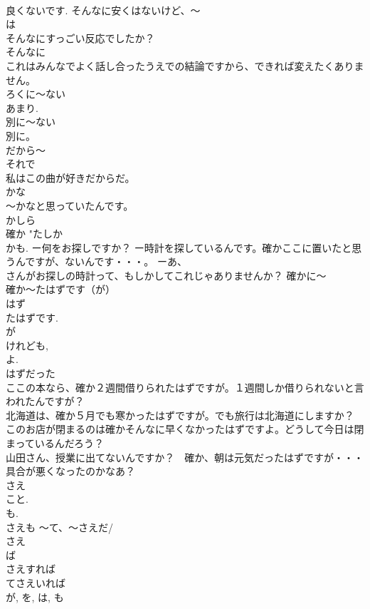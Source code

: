 \documentclass[8pt]{extreport}
\begin{document}
\begin{CJK}{UTF8}{min}
\\	良くないです. そんなに安くはないけど、～ 
\\	は 
\\	そんなにすっごい反応でしたか？ 
\\	そんなに 
\\	これはみんなでよく話し合ったうえでの結論ですから、できれば変えたくありません。 
\\	ろくに～ない	
\\	あまり. 
\\	別に～ない 
\\	別に。 
\\	だから～	
\\	それで 
\\	私はこの曲が好きだからだ。
\\	かな	
\\	～かなと思っていたんです。　
\\	かしら 
\\	確か	"たしか 
\\	かも. ー何をお探しですか？ ー時計を探しているんです。確かここに置いたと思うんですが、ないんです・・・。 ーあ、
\\	さんがお探しの時計って、もしかしてこれじゃありませんか？ 確かに～ 
\\	確か～たはずです（が） 
\\	はず 
\\	たはずです. 
\\	が 
\\	けれども, 
\\	よ. 
\\	はずだった 
\\	ここの本なら、確か２週間借りられたはずですが。１週間しか借りられないと言われたんですが？ 
\\	北海道は、確か５月でも寒かったはずですが。でも旅行は北海道にしますか？ 
\\	このお店が閉まるのは確かそんなに早くなかったはずですよ。どうして今日は閉まっているんだろう？　
\\	山田さん、授業に出てないんですか？　確か、朝は元気だったはずですが・・・　具合が悪くなったのかなあ？ 
\\	さえ	
\\	こと. 
\\	も. 
\\	さえも ～て、～さえだ/
\\	さえ
\\	ば 
\\	さえすれば 
\\	てさえいれば 
\\	が, を, は, も 

\end{CJK}
\end{document}
